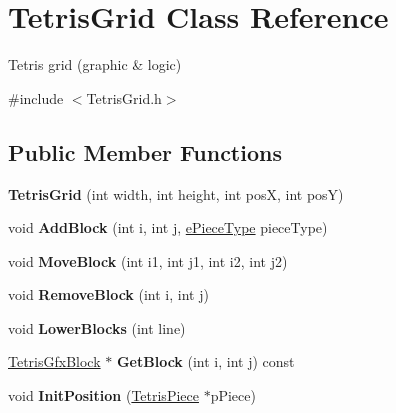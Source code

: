 \hypertarget{classTetrisGrid}{\section{Tetris\-Grid Class Reference}
\label{classTetrisGrid}
}


Tetris grid (graphic \& logic)  




{\ttfamily \#include $<$Tetris\-Grid.\-h$>$}

\subsection*{Public Member Functions}
\begin{DoxyCompactItemize}
\item 
\hypertarget{classTetrisGrid_a7720a869fa7feffa1a991345af7f13ed}{{\bfseries Tetris\-Grid} (int width, int height, int pos\-X, int pos\-Y)}\label{classTetrisGrid_a7720a869fa7feffa1a991345af7f13ed}

\item 
\hypertarget{classTetrisGrid_ae7533f2325688fe3645f21c34e7c728c}{void {\bfseries Add\-Block} (int i, int j, \hyperlink{TetrisGfxBlock_8h_a2592cbf66d668df0e31fa8d0d8a174de}{e\-Piece\-Type} piece\-Type)}\label{classTetrisGrid_ae7533f2325688fe3645f21c34e7c728c}

\item 
\hypertarget{classTetrisGrid_a34b01d1ff5ed251f40928cc24c6c7bb9}{void {\bfseries Move\-Block} (int i1, int j1, int i2, int j2)}\label{classTetrisGrid_a34b01d1ff5ed251f40928cc24c6c7bb9}

\item 
\hypertarget{classTetrisGrid_ac6ce9ef1829591c332500578736d8ce9}{void {\bfseries Remove\-Block} (int i, int j)}\label{classTetrisGrid_ac6ce9ef1829591c332500578736d8ce9}

\item 
\hypertarget{classTetrisGrid_a68e84fdbd1c9aa8ab580dc1e05a21574}{void {\bfseries Lower\-Blocks} (int line)}\label{classTetrisGrid_a68e84fdbd1c9aa8ab580dc1e05a21574}

\item 
\hypertarget{classTetrisGrid_a6e33007c87079a7bd4f8ec33efcfd40b}{\hyperlink{classTetrisGfxBlock}{Tetris\-Gfx\-Block} $\ast$ {\bfseries Get\-Block} (int i, int j) const }\label{classTetrisGrid_a6e33007c87079a7bd4f8ec33efcfd40b}

\item 
\hypertarget{classTetrisGrid_a051cced596b77b6daf86f243c098f70f}{void {\bfseries Init\-Position} (\hyperlink{classTetrisPiece}{Tetris\-Piece} $\ast$p\-Piece)}\label{classTetrisGrid_a051cced596b77b6daf86f243c098f70f}


\end{DoxyCompactItemize}
